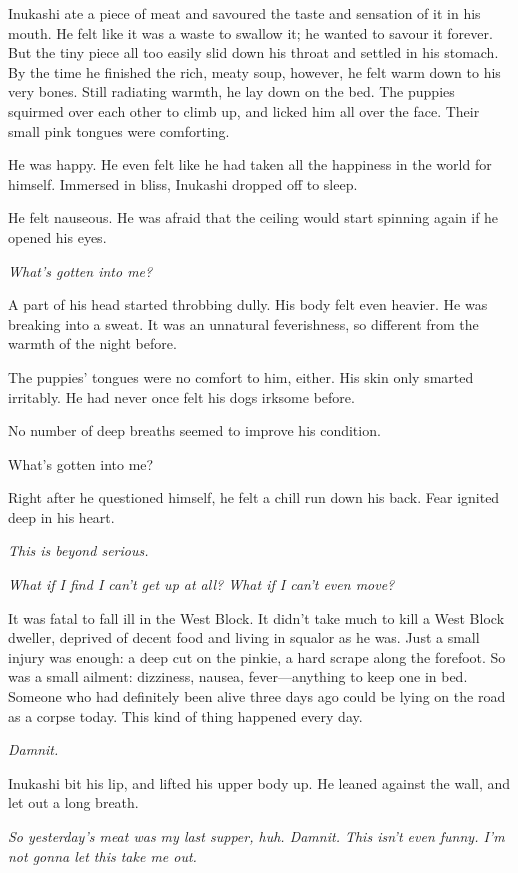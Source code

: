 Inukashi ate a piece of meat and savoured the taste and sensation of it
in his mouth. He felt like it was a waste to swallow it; he wanted to
savour it forever. But the tiny piece all too easily slid down his
throat and settled in his stomach. By the time he finished the rich,
meaty soup, however, he felt warm down to his very bones. Still
radiating warmth, he lay down on the bed. The puppies squirmed over each
other to climb up, and licked him all over the face. Their small pink
tongues were comforting.

He was happy. He even felt like he had taken all the happiness in the
world for himself. Immersed in bliss, Inukashi dropped off to sleep.

He felt nauseous. He was afraid that the ceiling would start spinning
again if he opened his eyes.

\emph{What's gotten into me?}

A part of his head started throbbing dully. His body felt even heavier.
He was breaking into a sweat. It was an unnatural feverishness, so
different from the warmth of the night before.

The puppies' tongues were no comfort to him, either. His skin only
smarted irritably. He had never once felt his dogs irksome before.

No number of deep breaths seemed to improve his condition.

What's gotten into me?

Right after he questioned himself, he felt a chill run down his back.
Fear ignited deep in his heart.

\emph{This is beyond serious.}

\emph{What if I find I can't get up at all? What if I can't even move?}

It was fatal to fall ill in the West Block. It didn't take much to kill
a West Block dweller, deprived of decent food and living in squalor as
he was. Just a small injury was enough: a deep cut on the pinkie, a hard
scrape along the forefoot. So was a small ailment: dizziness, nausea,
fever---anything to keep one in bed. Someone who had definitely been alive
three days ago could be lying on the road as a corpse today. This kind
of thing happened every day.

\emph{Damnit.}

Inukashi bit his lip, and lifted his upper body up. He leaned against
the wall, and let out a long breath.

\emph{So yesterday's meat was my last supper, huh. Damnit. This isn't even
funny. I'm not gonna let this take me out.}

